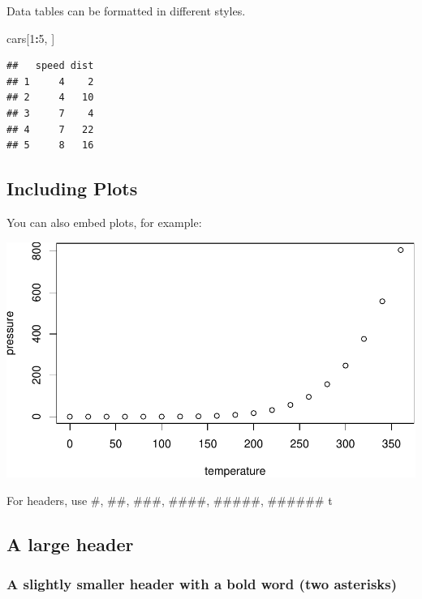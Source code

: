 \documentclass[
]{article}
\newenvironment{Shaded}{\begin{snugshade}}{\end{snugshade}}
\newcommand{\DecValTok}[1]{\textcolor[rgb]{0.00,0.00,0.81}{#1}}
\newcommand{\NormalTok}[1]{#1}
\newcommand{\SpecialCharTok}[1]{\textcolor[rgb]{0.81,0.36,0.00}{\textbf{#1}}}
\begin{document}
Data tables can be formatted in different styles.

\begin{Shaded}
\begin{Highlighting}[]
\NormalTok{cars[}\DecValTok{1}\SpecialCharTok{:}\DecValTok{5}\NormalTok{, ]}
\end{Highlighting}
\end{Shaded}

\begin{verbatim}
##   speed dist
## 1     4    2
## 2     4   10
## 3     7    4
## 4     7   22
## 5     8   16
\end{verbatim}

\subsection{Including Plots}\label{including-plots}

You can also embed plots, for example:

\includegraphics{03-RMarkdown_files/figure-latex/pressure-1.pdf}

For headers, use \#, \#\#, \#\#\#, \#\#\#\#, \#\#\#\#\#, \#\#\#\#\#\# t

\subsection{A large header}\label{a-large-header}

\subsubsection{\texorpdfstring{A slightly smaller header with a
\textbf{bold} word (two
asterisks)}{A slightly smaller header with a bold word (two asterisks)}}\label{a-slightly-smaller-header-with-a-bold-word-two-asterisks}
\end{document}
